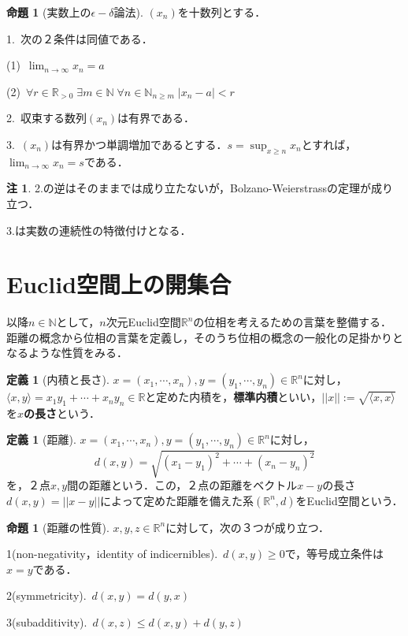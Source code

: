 \documentclass[uplatex, 12pt, dvipdfmx]{jsreport}
\theoremstyle{definition}
\newtheorem{proposition}[theorem]{命題}
\newtheorem{definition}[theorem]{定義}
\newtheorem{remark}[theorem]{注}
\theoremstyle{StatementsWithStar}
\theoremstyle{StatementsWithStar2}
\theoremstyle{StatementsWithStar3}
\theoremstyle{StatementsWithCCirc}
\theoremstyle{definition}
\begin{document}
\begin{proposition}[実数上の$\epsilon-\delta$論法]\rm{}$(x_n)$を十数列とする．
    
    1.\, 次の２条件は同値である．

    (1)\, $\lim_{n\to\infty}x_n=a$

    (2)\, $\forall r\in\mathbb{R}_{>0}\; \exists m\in\mathbb{N} \; \forall n\in\mathbb{N}_{n\ge m} \; |x_n-a|<r$

    2.\, 収束する数列$(x_n)$は有界である．

    3.\, $(x_n)$は有界かつ単調増加であるとする．$s=\sup_{x\ge n}x_n$とすれば，$\lim_{n\to\infty}x_n=s$である．
\end{proposition}
\begin{remark}\rm{}
    2.の逆はそのままでは成り立たないが，Bolzano-Weierstrassの定理が成り立つ．

    3.は実数の連続性の特徴付けとなる．
\end{remark}

\section{Euclid空間上の開集合}
以降$n\in\mathbb{N}$として，$n$次元Euclid空間$\mathbb{R}^n$の位相を考えるための言葉を整備する．
距離の概念から位相の言葉を定義し，そのうち位相の概念の一般化の足掛かりとなるような性質をみる．

\begin{definition}[内積と長さ]
    $x=(x_1,\cdots,x_n),y=(y_1,\cdots,y_n)\in\mathbb{R}^n$に対し，$\langle x,y\rangle =x_1y_1+\cdots +x_ny_n\in\mathbb{R}$と定めた内積を，\textbf{標準内積}といい，$||x||:=\sqrt{\langle x,x\rangle}$を\textbf{$x$の長さ}という．
\end{definition}
\begin{definition}[距離]\rm{}
    $x=(x_1,\cdots,x_n),y=(y_1,\cdots,y_n)\in\mathbb{R}^n$に対し，
    \[ d(x,y)=\sqrt{(x_1-y_1)^2+\cdots +(x_n-y_n)^2} \]
    を，２点$x,y$間の距離という．この，２点の距離をベクトル$x-y$の長さ$d(x,y)=||x-y||$によって定めた距離を備えた系$(\mathbb{R}^n,d)$をEuclid空間という．
\end{definition}

\begin{proposition}[距離の性質]\rm{}$x,y,z\in\mathbb{R}^n$に対して，次の３つが成り立つ．

    1(non-negativity，identity of indicernibles).\, $d(x,y)\ge 0$で，等号成立条件は$x=y$である．

    2(symmetricity).\, $d(x,y)=d(y,x)$

    3(subadditivity).\, $d(x,z)\le d(x,y)+d(y,z)$
\end{proposition}
\end{document}
